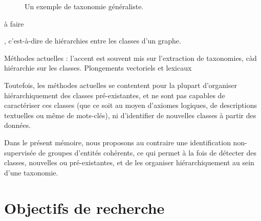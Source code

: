 \begin{figure}[h]
    \centering
    
    \caption{Un exemple de taxonomie généraliste.}
    \label{fig:intro-taxo}
\end{figure}



à faire

, c'est-à-dire de hiérarchies entre les classes d'un graphe.


Méthodes actuelles : l'accent est souvent mis sur l'extraction de taxonomies, càd hiérarchie sur les classes. Plongements vectoriels et lexicaux 


Toutefois, les méthodes actuelles se contentent pour la plupart d'organiser hiérarchiquement des classes pré-existantes, et ne sont pas capables de caractériser ces classes (que ce soit au moyen d'axiomes logiques, de descriptions textuelles ou même de mots-clés), ni d'identifier de nouvelles classes à partir des données.

Dans le présent mémoire, nous proposons au contraire une identification non-supervisée de groupes d'entités cohérents, ce qui permet à la fois de détecter des classes, nouvelles ou pré-existantes, et de les organiser hiérarchiquement au sein d'une taxonomie. %




\section{Objectifs de recherche}  %


